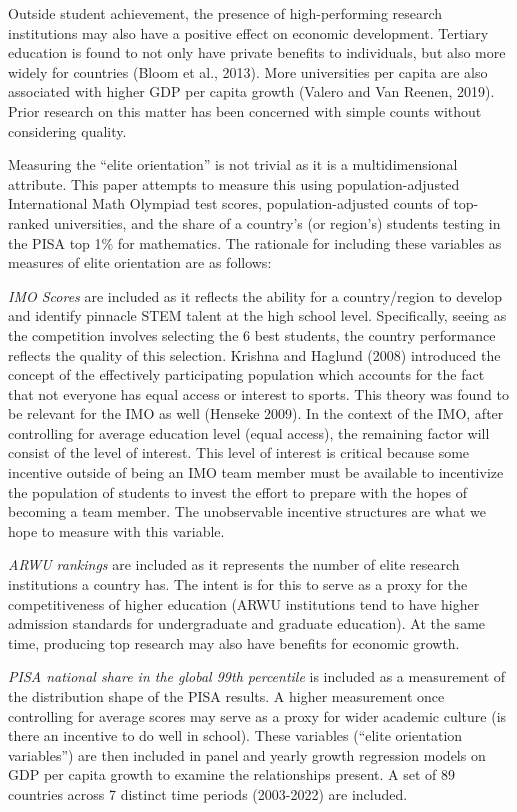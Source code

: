 \documentclass[11pt]{article}
\begin{document}
Outside student achievement, the presence of high-performing research institutions may also have a positive effect on economic development. Tertiary education is found to not only have private benefits to individuals, but also more widely for countries (Bloom et al., 2013). More universities per capita are also associated with higher GDP per capita growth (Valero and Van Reenen, 2019). Prior research on this matter has been concerned with simple counts without considering quality.

Measuring the “elite orientation” is not trivial as it is a multidimensional attribute. This paper attempts to measure this using population-adjusted International Math Olympiad test scores, population-adjusted counts of top-ranked universities, and the share of a country’s (or region’s) students testing in the PISA top 1\% for mathematics. The rationale for including these variables as measures of elite orientation are as follows:

\textit{IMO Scores} are included as it reflects the ability for a country/region to develop and identify pinnacle STEM talent at the high school level. Specifically, seeing as the competition involves selecting the 6 best students, the country performance reflects the quality of this selection. Krishna and Haglund (2008) introduced the concept of the effectively participating population which accounts for the fact that not everyone has equal access or interest to sports. This theory was found to be relevant for the IMO as well (Henseke 2009).  In the context of the IMO, after controlling for average education level (equal access), the remaining factor will consist of the level of interest. This level of interest is critical because some incentive outside of being an IMO team member must be available to incentivize the population of students to invest the effort to prepare with the hopes of becoming a team member. The unobservable incentive structures are what we hope to measure with this variable.

\textit{ARWU rankings} are included as it represents the number of elite research institutions a country has. The intent is for this to serve as a proxy for the competitiveness of higher education (ARWU institutions tend to have higher admission standards for undergraduate and graduate education). At the same time, producing top research may also have benefits for economic growth.

\textit{PISA national share in the global 99th percentile} is included as a measurement of the distribution shape of the PISA results. A higher measurement once controlling for average scores may serve as a proxy for wider academic culture (is there an incentive to do well in school).
These variables (“elite orientation variables”) are then included in panel and yearly growth regression models on GDP per capita growth to examine the relationships present. A set of 89 countries across 7 distinct time periods (2003-2022) are included.
\end{document}
